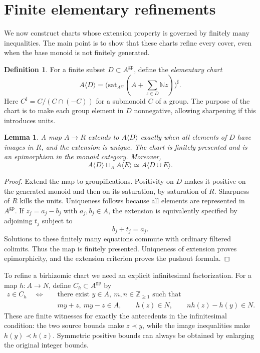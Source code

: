 \documentclass[11pt]{article}
\newtheorem{lemma}[theorem]{Lemma}
\theoremstyle{definition}
\newtheorem{definition}[theorem]{Definition}
\theoremstyle{remark}
\newcommand{\N}{\mathbb N}
\newcommand{\Z}{\mathbb Z}
\newcommand{\gp}{\mathrm{gp}}
\newcommand{\sat}{\mathrm{sat}}
\begin{document}
\section{Finite elementary refinements}

We now construct charts whose extension property is governed by finitely many inequalities. The main point is to show that these charts refine every cover, even when the base monoid is not finitely generated.

\begin{definition}\label{def:elementary}
For a finite subset $D\subset A^{\gp}$, define the \emph{elementary chart}
\[
 A\langle D\rangle
 =\bigl(\sat_{A^{\gp}}(A+\textstyle\sum_{z\in D}\N z)\bigr)^\sharp.
\]
Here $C^\sharp=C/(C\cap(-C))$ for a submonoid $C$ of a group. The purpose of the chart is to make each group element in $D$ nonnegative, allowing sharpening if this introduces units.
\end{definition}

\begin{lemma}\label{lem:elementary}
A map $A\to R$ extends to $A\langle D\rangle$ exactly when all elements of $D$ have images in $R$, and the extension is unique. The chart is finitely presented and is an epimorphism in the monoid category. Moreover,
\[
 A\langle D\rangle\sqcup_A A\langle E\rangle
 \simeq A\langle D\cup E\rangle.
\]
\end{lemma}

\begin{proof}
Extend the map to groupifications. Positivity on $D$ makes it positive on the generated monoid and then on its saturation, by saturation of $R$. Sharpness of $R$ kills the units. Uniqueness follows because all elements are represented in $A^{\gp}$. If $z_j=a_j-b_j$ with $a_j,b_j\in A$, the extension is equivalently specified by adjoining $t_j$ subject to
\[
 b_j+t_j=a_j.
\]
Solutions to these finitely many equations commute with ordinary filtered colimits. Thus the map is finitely presented. Uniqueness of extension proves epimorphicity, and the extension criterion proves the pushout formula.
\end{proof}

To refine a birhizomic chart we need an explicit infinitesimal factorization. For a map $h:A\to N$, define $C_h\subset A^{\gp}$ by
\begin{equation}\label{eq:Ch}
\begin{split}
 z\in C_h\quad\Longleftrightarrow\quad
 &\text{there exist }y\in A,\ m,n\in\Z_{\geq1}\text{ such that}\\
 &my+z,\ my-z\in A,\qquad
 h(z)\in N,\qquad nh(z)-h(y)\in N.
\end{split}
\end{equation}
These are finite witnesses for exactly the antecedents in the infinitesimal condition: the two source bounds make $z\prec y$, while the image inequalities make $h(y)\prec h(z)$. Symmetric positive bounds can always be obtained by enlarging the original integer bounds.
\end{document}
